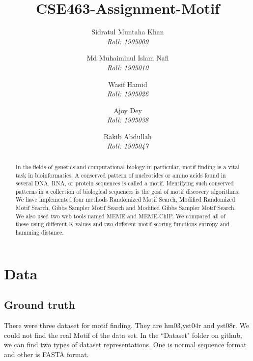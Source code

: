\documentclass{article}
\begin{document}
\date{}  %

\thispagestyle{empty}
\title{CSE463-Assignment-Motif}

\author{
    \Large Sidratul Muntaha Khan \\
    \large \textit{Roll: 1905009} \\
    \and
    \Large Md Muhaiminul Islam Nafi \\
    \large \textit{Roll: 1905010}
    \and
    \Large Wasif Hamid \\
    \Large \textit{Roll: 1905026}
    \and
    \Large Ajoy Dey \\
    \Large \textit{Roll: 1905038}
    \and
    \Large Rakib Abdullah \\
    \Large \textit{Roll: 1905047}
}

\maketitle

\begin{abstract}
\noindent
In the fields of genetics and computational biology in particular, motif finding is a vital task in bioinformatics. A conserved pattern of nucleotides or amino acids found in several DNA, RNA, or protein sequences is called a motif. Identifying such conserved patterns in a collection of biological sequences is the goal of motif discovery algorithms. We have implemented four methods Randomized Motif Search, Modified Randomized Motif Search, Gibbs Sampler Motif Search and Modified Gibbs Sampler Motif Search. We also used two web tools\cite{gkv416} named MEME and MEME-ChIP. We compared all of these using different K values and two different motif scoring functions entropy and hamming distance.
\end{abstract}

\clearpage
\tableofcontents

\clearpage

\section{Data} 
\subsection{Ground truth}
There were three dataset for motif finding. They are hm03,yst04r and yst08r. We could not find the real Motif of the data set. In the ``Dataset" folder on github, we can find two types of dataset representations. One is normal sequence format and other is FASTA format.
\end{document}

